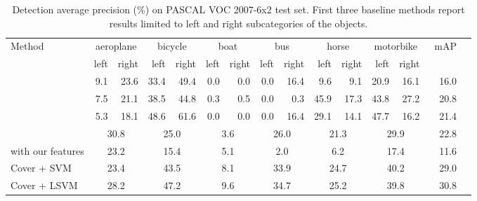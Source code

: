 \documentclass{article}
\begin{document}
\begin{table*}[htbp]
\footnotesize
\centering
\renewcommand{\arraystretch}{1.0}
\renewcommand{\tabcolsep}{1.5mm}
\begin{tabular}{l*{14}{r}}
\toprule
\multirow{2}{*}{Method} & \multicolumn{2}{c}{aeroplane} & \multicolumn{2}{c}{bicycle} & \multicolumn{2}{c}{boat} & \multicolumn{2}{c}{bus}& \multicolumn{2}{c}{horse} & \multicolumn{2}{c}{motorbike} & \multirow{2}{*}{~mAP}\\
  & left & right & left & right & left & right & left & right & left & right & left & right\\
\midrule
\cite{deselaers1}  & 9.1 & 23.6 & 33.4 & 49.4 & 0.0 & 0.0 & 0.0 & 16.4 & 9.6 & 9.1 & 20.9 & 16.1 & ~16.0\\
\midrule
\cite{pandey}  & 7.5 & 21.1 & 38.5 & 44.8 & 0.3 & 0.5 & 0.0 & 0.3 & 45.9 & 17.3 & 43.8 & 27.2 & ~20.8\\
\midrule
\cite{deselaers2}  & 5.3 & 18.1 & 48.6 & 61.6 & 0.0 & 0.0 & 0.0 & 16.4 & 29.1 & 14.1 & 47.7 & 16.2 & ~21.4\\
\midrule
\cite{russakovsky} & \multicolumn{2}{c}{30.8} & \multicolumn{2}{c}{25.0}  & \multicolumn{2}{c}{3.6} & \multicolumn{2}{c}{26.0}  & \multicolumn{2}{c}{21.3}  & \multicolumn{2}{c}{29.9} &~ 22.8\\
\midrule
\cite{siva2012defence} with our features &  \multicolumn{2}{c}{23.2} &  \multicolumn{2}{c}{15.4} &  \multicolumn{2}{c}{5.1} &  \multicolumn{2}{c}{2.0} &  \multicolumn{2}{c}{6.2} &  \multicolumn{2}{c}{17.4} & ~11.6\\
\midrule
Cover + SVM & \multicolumn{2}{c}{23.4} & \multicolumn{2}{c}{43.5}  & \multicolumn{2}{c}{8.1} & \multicolumn{2}{c}{33.9}  & \multicolumn{2}{c}{24.7}  & \multicolumn{2}{c}{40.2} &~ 29.0\\
\midrule
Cover + LSVM & \multicolumn{2}{c}{28.2} & \multicolumn{2}{c}{47.2}  & \multicolumn{2}{c}{9.6} & \multicolumn{2}{c}{34.7}  & \multicolumn{2}{c}{25.2}  & \multicolumn{2}{c}{39.8} &~ 30.8\\
\bottomrule
\end{tabular}
\caption{Detection average precision (\%) on PASCAL VOC 2007-6x2 test set. First three baseline methods report results limited to left and right subcategories of the objects.}
\label{tab:detection-6x2}
\end{table*}
\end{document}
